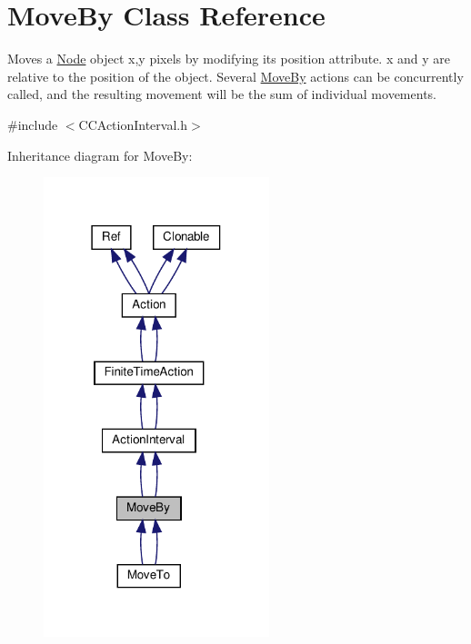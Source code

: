 \hypertarget{classMoveBy}{}\section{Move\+By Class Reference}
\label{classMoveBy}


Moves a \hyperlink{classNode}{Node} object x,y pixels by modifying it\textquotesingle{}s position attribute. x and y are relative to the position of the object. Several \hyperlink{classMoveBy}{Move\+By} actions can be concurrently called, and the resulting movement will be the sum of individual movements.  




{\ttfamily \#include $<$C\+C\+Action\+Interval.\+h$>$}



Inheritance diagram for Move\+By\+:
\nopagebreak
\begin{figure}[H]
\begin{center}
\leavevmode
\includegraphics[width=186pt]{classMoveBy__inherit__graph}
\end{center}
\end{figure}


